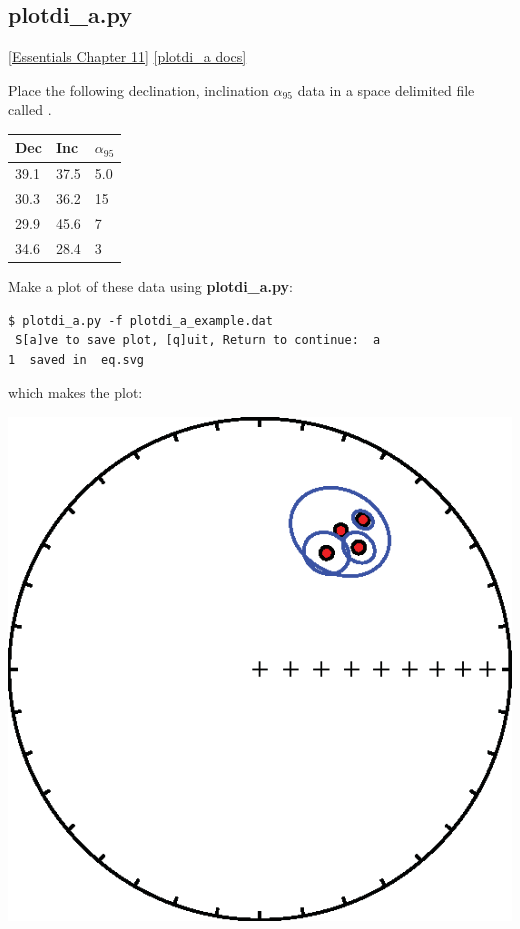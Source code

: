 \documentclass[11pt]{book}
\begin{document}
{{  

\subsection{plotdi\_a.py}
\href{http://earthref.org/MAGIC/books/Tauxe/Essentials/WebBook3ch11.html#ch11}{[Essentials Chapter 11]}
\href{https://github.com/PmagPy/PmagPy/blob/master/programs/plotdi_a.py}{[plotdi\_a docs]}

Place the following declination, inclination $\alpha_{95}$ data in a space delimited file called .

\begin{tabular}{lll}
\hline
Dec\qquad &Inc\qquad &$\alpha_{95}$\\
\hline
39.1 \qquad & 37.5 \qquad & 5.0\\
30.3 \qquad & 36.2 \qquad & 15\\
29.9 \qquad & 45.6 \qquad & 7\\
34.6 \qquad & 28.4 \qquad & 3\\
\hline
\end{tabular}

Make a plot of these data using {\bf plotdi\_a.py}:

\begin{verbatim}
$ plotdi_a.py -f plotdi_a_example.dat
 S[a]ve to save plot, [q]uit, Return to continue:  a
1  saved in  eq.svg
\end{verbatim}
\noindent  which makes the plot:


  \includegraphics[width=12 cm]{EPSfiles/plotdi-a-example.eps}

}}
\end{document}
